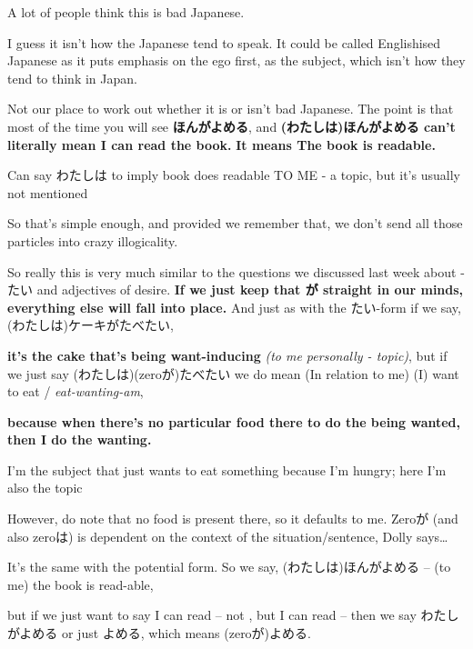 \thinrule

A lot of people think this is bad Japanese.

I guess it isn't how the Japanese tend to speak. It could be called Englishised Japanese as it puts emphasis on the ego first, as the subject, which isn't how they tend to think in Japan.

Not our place to work out whether it is or isn't bad Japanese. The point is that most of the time you will see {\bf ほんがよめる}, and {\bf (わたしは)ほんがよめる can't literally mean I can read the book.} {\bf It means The book is readable.}

Can say わたしは to imply book does readable TO ME - a topic, but it's usually not mentioned

So that's simple enough, and provided we remember that, we don't send all those particles into crazy illogicality.

{}

So really this is very much similar to the questions we discussed last week about -たい and adjectives of desire. {\bf If we just keep that が straight in our minds, everything else will fall into place.} And just as with the たい-form if we say, (わたしは)ケーキがたべたい,

{}

{\bf it's the cake that's being want-inducing} {\em (to me personally - topic)}, but if we just say (わたしは)(zeroが)たべたい we do mean (In relation to me) (I) want to eat / {\em eat-wanting-am},

{}

{\bf because when there's no particular food there to do the being wanted, then I do the wanting.}

I'm the subject that just wants to eat something because I'm hungry; here I'm also the topic

However, do note that no food is present there, so it defaults to me. Zeroが (and also zeroは) is dependent on the context of the situation/sentence, Dolly says\ldots{}

{}

It's the same with the potential form. So we say, (わたしは)ほんがよめる -- (to me) the book is read-able,

{}

but if we just want to say I can read -- not , but I can read -- then we say わたしがよめる or just よめる, which means (zeroが)よめる.

